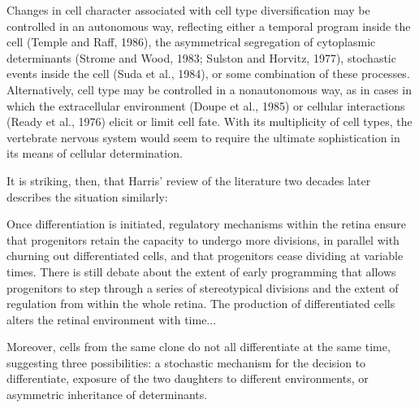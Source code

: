\begin{longquote}
Changes in cell character associated with cell type diversification may be controlled in an autonomous way, reflecting either a temporal program inside the cell (Temple and Raff, 1986), the asymmetrical segregation of cytoplasmic determinants (Strome and Wood,
1983; Sulston and Horvitz, 1977), stochastic events inside the cell (Suda et al., 1984), or some combination of
these processes. Alternatively, cell type may be controlled in a nonautonomous way, as in cases in which
the extracellular environment (Doupe et al., 1985) or
cellular interactions (Ready et al., 1976) elicit or limit cell
fate. With its multiplicity of cell types, the vertebrate nervous system would seem to require the ultimate sophistication in its means of cellular determination. 
\cite{Holt1988}
\end{longquote}

It is striking, then, that Harris' review of the literature two decades later describes the situation similarly:

\begin{longquote}
Once differentiation is initiated, regulatory
mechanisms within the retina ensure that progenitors retain the capacity to undergo more
divisions, in parallel with churning out differentiated cells, and that progenitors cease dividing at variable times. There is still debate
about the extent of early programming that allows progenitors to step through a series of
stereotypical divisions and the extent of regulation from within the whole retina. The production of differentiated cells alters the retinal
environment with time...

Moreover, cells from the same clone do not all
differentiate at the same time, suggesting three
possibilities: a stochastic mechanism for the
decision to differentiate, exposure of the two
daughters to different environments, or asymmetric inheritance of determinants.
\cite{Agathocleous2009}
\end{longquote}

